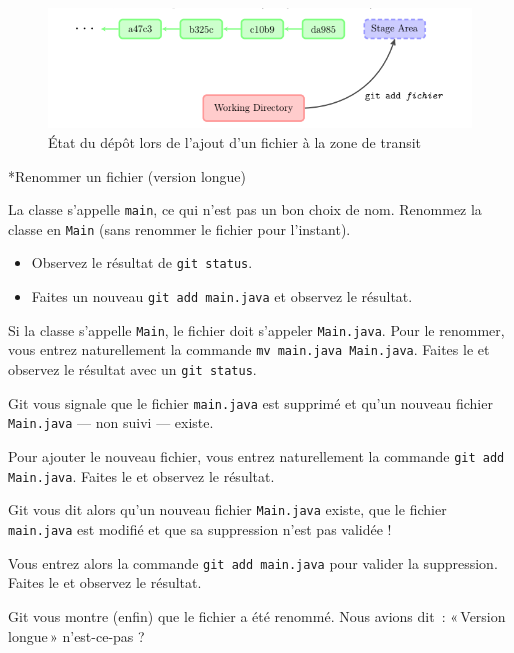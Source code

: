\documentclass[a4paper,11pt]{style-esi/td}
\begin{document}
\begin{figure}[h]
	\centering
	\includegraphics[width=\linewidth]{img/depot-git-add.png}
	\caption{État du dépôt lors de l'ajout d'un fichier à la zone de transit}
	\label{fig:git-add}
\end{figure}

\begin{Exercice}*{Renommer un fichier (version longue)}
	\begin{steps}
		
	\item La classe s'appelle \texttt{main}, ce qui n'est pas un bon choix de
		nom. Renommez la classe en \texttt{Main} (sans renommer le fichier pour
		l'instant). 
		\begin{itemize}
			\item Observez le résultat de \texttt{git status}.
			\item Faites un nouveau \texttt{git add main.java} et observez le
				résultat. 
		\end{itemize}

	\item Si la classe s'appelle \texttt{Main}, le fichier doit s'appeler
		\texttt{Main.java}. Pour le renommer, vous entrez naturellement la
		commande \texttt{mv main.java Main.java}. Faites le et observez le 
		résultat avec un \texttt{git status}.

		Git vous signale que le fichier \texttt{main.java} est supprimé et
		qu'un nouveau fichier \texttt{Main.java} — non suivi — existe. 

	\item Pour ajouter le nouveau fichier, vous entrez naturellement la commande 
		\texttt{git add Main.java}. Faites le et observez le résultat.  

		Git vous dit alors qu'un nouveau fichier \texttt{Main.java} existe, que
		le fichier \texttt{main.java} est modifié et que sa suppression n'est
		pas validée ! 
		
	\item Vous entrez alors la commande \texttt{git add main.java} pour valider
		la suppression. Faites le et observez le résultat. 

		Git vous montre (enfin) que le fichier a été renommé. Nous avions dit :
		« Version longue » n'est-ce-pas ? 

	\end{steps}
\end{Exercice}
\end{document}
